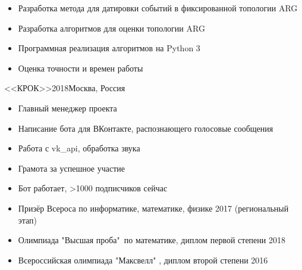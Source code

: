 \documentclass[10pt,a4paper,ragged2e]{maltacv}
\begin{document}
\medskip
{}

\begin{itemize}
  \item Разработка метода для датировки событий в фиксированной топологии ARG
  \item Разработка алгоритмов для оценки топологии ARG
  \item Программная реализация алгоритмов на Python 3
  \item Оценка точности и времен работы
\end{itemize}

\divider

 {<<КРОК>>}{2018}{Москва, Россия}{}
\begin{itemize}
  \item Главный менеджер проекта
  \item Написание бота для ВКонтакте, распознающего голосовые сообщения
  \item Работа с vk\_api, обработка звука
  \item Грамота за успешное участие
  \item Бот работает, >1000 подписчиков сейчас
\end{itemize}

\medskip
{}
\medskip
\begin{itemize}{}
  \item{Призёр Всероса по информатике, математике, физике 2017 (региональный этап)}{}
  
  \item{Олимпиада "Высшая проба"\ по математике, диплом первой степени 2018}{}

  \item{Всероссийская олимпиада "Максвелл" , диплом второй степени 2016}{}
  
\end{itemize}
\end{document}
